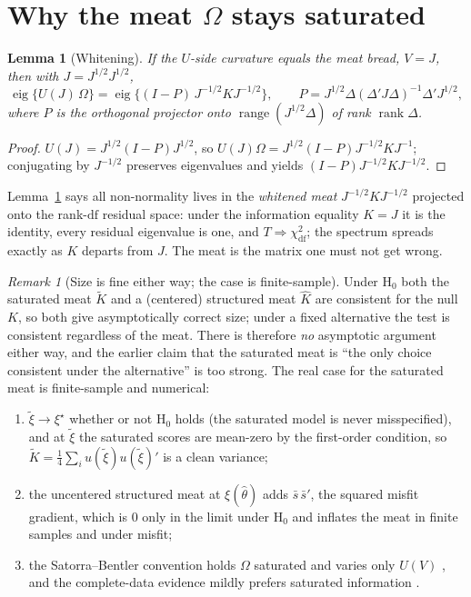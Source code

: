 \documentclass[11pt]{article}
\newcommand{\eig}{\operatorname{eig}}
\newcommand{\rank}{\operatorname{rank}}
\theoremstyle{plain}
\newtheorem{lemma}{Lemma}
\theoremstyle{remark}
\newtheorem*{remark}{Remark}
\begin{document}
\section*{Why the meat \(\Omega\) stays saturated}
\label{sec:meat}

\begin{lemma}[Whitening]\label{lem:white}
If the \(U\)-side curvature equals the meat bread, \(V=J\), then with
\(J=J^{1/2}J^{1/2}\),
\[
  \eig\{U(J)\,\Omega\}
    =
  \eig\!\big\{(I-P)\,J^{-1/2}KJ^{-1/2}\big\},
  \qquad
  P = J^{1/2}\Delta(\Delta'J\Delta)^{-1}\Delta'J^{1/2},
\]
where \(P\) is the orthogonal projector onto \(\operatorname{range}(J^{1/2}
\Delta)\) of rank \(\rank\Delta\).
\end{lemma}
\begin{proof}
\(U(J)=J^{1/2}(I-P)J^{1/2}\), so \(U(J)\Omega=J^{1/2}(I-P)J^{-1/2}KJ^{-1}\);
conjugating by \(J^{-1/2}\) preserves eigenvalues and yields
\((I-P)J^{-1/2}KJ^{-1/2}\).
\end{proof}

Lemma~\ref{lem:white} says all non-normality lives in the \emph{whitened meat}
\(J^{-1/2}KJ^{-1/2}\) projected onto the rank-\(\mathrm{df}\) residual space:
under the information equality \(K=J\) it is the identity, every residual
eigenvalue is one, and \(T\Rightarrow\chi^2_{\mathrm{df}}\); the spectrum
spreads exactly as \(K\) departs from \(J\). The meat is the matrix one must not
get wrong.

\begin{remark}[Size is fine either way; the case is finite-sample]
Under \(\mathrm{H}_0\) both the saturated meat \(\tilde K\) and a (centered)
structured meat \(\hat K\) are consistent for the null \(K\), so both give
asymptotically correct size; under a fixed alternative the test is consistent
regardless of the meat. There is therefore \emph{no} asymptotic argument either
way, and the earlier claim that the saturated meat is ``the only choice
consistent under the alternative'' is too strong. The real case for the
saturated meat is finite-sample and numerical:
\begin{enumerate}
\item \(\tilde\xi\to\xi^\star\) whether or not \(\mathrm{H}_0\) holds (the
saturated model is never misspecified), and at \(\tilde\xi\) the saturated
scores are mean-zero by the first-order condition, so
\(\tilde K=\tfrac14\sum_i u(\tilde\xi)u(\tilde\xi)'\) is a clean variance;
\item the uncentered structured meat at \(\xi(\hat\theta)\) adds
\(\bar s\,\bar s'\), the squared misfit gradient, which is \(0\) only in the
limit under \(\mathrm{H}_0\) and inflates the meat in finite samples and under
misfit;
\item the Satorra--Bentler convention holds \(\Omega\) saturated and varies only
\(U(V)\) \cite{satorrabentler1994,satorra2000}, and the complete-data evidence
mildly prefers saturated information \cite{xia2016,savaleirosseel2022}.
\end{enumerate}
\end{remark}
\end{document}
